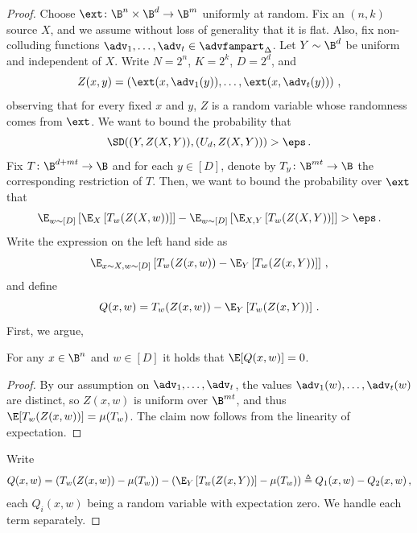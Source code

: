 \begin{proof}
Choose $\ext \colon \B^{n} \times \B^{d} \rightarrow \B^{m}$ uniformly at random.
Fix an $(n,k)$ source $X$, and we assume without loss of generality that it is flat. Also, fix non-colluding functions $\adv_1,\ldots,\adv_t \in \advfampart_{\Delta}$. Let $Y \sim \B^{d}$ be uniform and independent of $X$.
Write $N = 2^n$, $K = 2^k$, $D = 2^d$, and
\[
Z(x,y) = \left( \ext(x,\adv_1(y)),\ldots,\ext(x,\adv_t(y)) \right)\,,
\]
observing that for every fixed $x$ and $y$, $Z$ is a random variable whose
randomness comes from $\ext$. We want to bound the probability that
\[
\SD( (Y,Z(X,Y)),(U_d,Z(X,Y)) ) > \eps\,.
\]
Fix $T \colon \B^{d+mt}\rightarrow\B$ and for each $y \in [D]$, denote by
$T_y \colon \B^{mt} \rightarrow \B$ the corresponding restriction of $T$.
Then, we want to bound the probability over $\ext$ that
\[
\E_{w \sim [D]}\left[ \E_{X}\left[ T_{w}(Z(X,w)) \right] \right] - \E_{w \sim [D]}\left[ \E_{X,Y}\left[ T_{w}(Z(X,Y)) \right] \right] > \eps\,.
\]
Write the expression on the left hand side as
\[
\E_{x \sim X,w \sim [D]}\left[ T_{w}(Z(x,w)) - \E_{Y}\left[ T_{w}(Z(x,Y)) \right] \right]\,,
\]
and define
\[
Q(x,w) = T_{w}(Z(x,w)) - \E_{Y}\left[ T_{w}(Z(x,Y)) \right] \,.
\]
First, we argue,
\begin{claim}
For any $x \in \B^n$ and $w \in [D]$ it holds that $\E[Q(x,w)] = 0$.
\end{claim}
\begin{proof}
By our assumption on $\adv_1,\ldots,\adv_t$, the values $\adv_{1}(w),\ldots,\adv_{t}(w)$ 
are distinct, so $Z(x,w)$ is uniform over $\B^{mt}$, and thus $\E[T_{w}(Z(x,w))] = \mu(T_w)$.
The claim now follows from the linearity of expectation.
\end{proof}

Write
\[
Q(x,w) =\left( T_{w}(Z(x,w)) - \mu(T_w) \right) - \left( \E_{Y}\left[ T_{w}(Z(x,Y)) \right] - \mu(T_w) \right) 
\triangleq Q_{1}(x,w) - Q_{2}(x,w)\,,
\]
each $Q_{i}(x,w)$ being a random variable with expectation zero. We handle each term
separately.

%

\end{proof}
